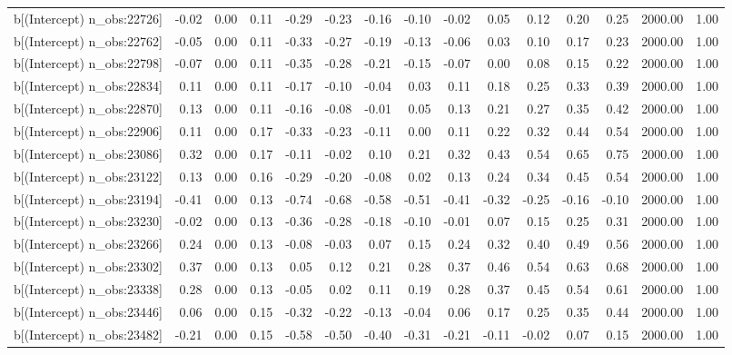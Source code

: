 \begin{table}[ht]
\begin{tabular}{rrrrrrrrrrrrrrr}
  b[(Intercept) n\_obs:22726] & -0.02 & 0.00 & 0.11 & -0.29 & -0.23 & -0.16 & -0.10 & -0.02 & 0.05 & 0.12 & 0.20 & 0.25 & 2000.00 & 1.00 \\ 
  b[(Intercept) n\_obs:22762] & -0.05 & 0.00 & 0.11 & -0.33 & -0.27 & -0.19 & -0.13 & -0.06 & 0.03 & 0.10 & 0.17 & 0.23 & 2000.00 & 1.00 \\ 
  b[(Intercept) n\_obs:22798] & -0.07 & 0.00 & 0.11 & -0.35 & -0.28 & -0.21 & -0.15 & -0.07 & 0.00 & 0.08 & 0.15 & 0.22 & 2000.00 & 1.00 \\ 
  b[(Intercept) n\_obs:22834] & 0.11 & 0.00 & 0.11 & -0.17 & -0.10 & -0.04 & 0.03 & 0.11 & 0.18 & 0.25 & 0.33 & 0.39 & 2000.00 & 1.00 \\ 
  b[(Intercept) n\_obs:22870] & 0.13 & 0.00 & 0.11 & -0.16 & -0.08 & -0.01 & 0.05 & 0.13 & 0.21 & 0.27 & 0.35 & 0.42 & 2000.00 & 1.00 \\ 
  b[(Intercept) n\_obs:22906] & 0.11 & 0.00 & 0.17 & -0.33 & -0.23 & -0.11 & 0.00 & 0.11 & 0.22 & 0.32 & 0.44 & 0.54 & 2000.00 & 1.00 \\ 
  b[(Intercept) n\_obs:23086] & 0.32 & 0.00 & 0.17 & -0.11 & -0.02 & 0.10 & 0.21 & 0.32 & 0.43 & 0.54 & 0.65 & 0.75 & 2000.00 & 1.00 \\ 
  b[(Intercept) n\_obs:23122] & 0.13 & 0.00 & 0.16 & -0.29 & -0.20 & -0.08 & 0.02 & 0.13 & 0.24 & 0.34 & 0.45 & 0.54 & 2000.00 & 1.00 \\ 
  b[(Intercept) n\_obs:23194] & -0.41 & 0.00 & 0.13 & -0.74 & -0.68 & -0.58 & -0.51 & -0.41 & -0.32 & -0.25 & -0.16 & -0.10 & 2000.00 & 1.00 \\ 
  b[(Intercept) n\_obs:23230] & -0.02 & 0.00 & 0.13 & -0.36 & -0.28 & -0.18 & -0.10 & -0.01 & 0.07 & 0.15 & 0.25 & 0.31 & 2000.00 & 1.00 \\ 
  b[(Intercept) n\_obs:23266] & 0.24 & 0.00 & 0.13 & -0.08 & -0.03 & 0.07 & 0.15 & 0.24 & 0.32 & 0.40 & 0.49 & 0.56 & 2000.00 & 1.00 \\ 
  b[(Intercept) n\_obs:23302] & 0.37 & 0.00 & 0.13 & 0.05 & 0.12 & 0.21 & 0.28 & 0.37 & 0.46 & 0.54 & 0.63 & 0.68 & 2000.00 & 1.00 \\ 
  b[(Intercept) n\_obs:23338] & 0.28 & 0.00 & 0.13 & -0.05 & 0.02 & 0.11 & 0.19 & 0.28 & 0.37 & 0.45 & 0.54 & 0.61 & 2000.00 & 1.00 \\ 
  b[(Intercept) n\_obs:23446] & 0.06 & 0.00 & 0.15 & -0.32 & -0.22 & -0.13 & -0.04 & 0.06 & 0.17 & 0.25 & 0.35 & 0.44 & 2000.00 & 1.00 \\ 
  b[(Intercept) n\_obs:23482] & -0.21 & 0.00 & 0.15 & -0.58 & -0.50 & -0.40 & -0.31 & -0.21 & -0.11 & -0.02 & 0.07 & 0.15 & 2000.00 & 1.00 \\ 

\end{tabular}
\end{table}
